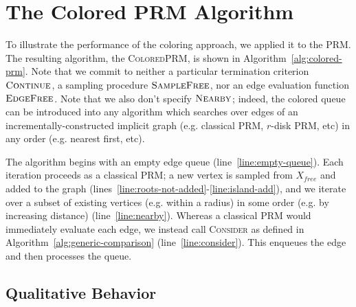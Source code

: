 \documentclass{report}
\begin{document}
\section{The Colored PRM Algorithm}
\label{sec:colored-prm}

To illustrate the performance of the coloring approach,
we applied it to the PRM.
The resulting algorithm, the \textsc{ColoredPRM},
is shown in Algorithm~\ref{alg:colored-prm}.
Note that we commit to
neither a particular termination criterion $\mbox{\textsc{Continue}}$,
a sampling procedure $\mbox{\textsc{SampleFree}}$,
nor an edge evaluation function $\mbox{\textsc{EdgeFree}}$.
Note that we also don't specify $\mbox{\textsc{Nearby}}$;
indeed, the colored queue can be introduced into any algorithm
which searches over edges of an incrementally-constructed implicit graph
(e.g. classical PRM, $r$-disk PRM, etc)
in any order (e.g. nearest first, etc).

The algorithm begins with an empty edge queue
(line~\ref{line:empty-queue}).
Each iteration proceeds as a classical PRM;
a new vertex is sampled from $X_{free}$ and added to the graph
(lines~\ref{line:roots-not-added}-\ref{line:island-add}),
and we iterate over a subset of existing vertices
(e.g. within a radius) in some order (e.g. by increasing distance)
(line~\ref{line:nearby}).
Whereas a classical PRM would immediately evaluate each edge,
we instead call \textsc{Consider} as defined in
Algorithm~\ref{alg:generic-comparison} (line~\ref{line:consider}).
This enqueues the edge and then processes the queue.

\subsection{Qualitative Behavior}
\end{document}
